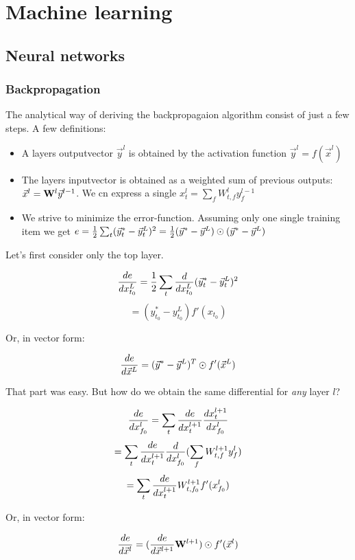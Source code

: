 \section{Machine learning}

\subsection{Neural networks}

\subsubsection{Backpropagation}
The analytical way of deriving the backpropagaion algorithm consist of just a few steps. 
A few definitions: 

\begin{itemize}
	\item A layers outputvector $\vec{y}^l$ is obtained by the activation function $\vec{y}^l = f(\vec{x}^l) $
	\item The layers inputvector is obtained as a weighted sum of previous outputs: $\vec{x}^l = \mathbf{W}^l \vec{y}^{l-1} $. We cn express a single $x_t^l = \sum_f W_{t,f}^l y_f^{l-1}$
	\item We strive to minimize the error-function. Assuming only one single training item we get $e = \frac{1}{2} \sum_t (\vec{y}^*_t - \vec{y}^L_t)^2 = \frac{1}{2} (\vec{y}^* - \vec{y}^L) \odot (\vec{y}^* - \vec{y}^L) $
\end{itemize}

Let's first consider only the top layer. 

$$   \frac{ \mathop{de} }{ \mathop{dx_{t_0}^L} }  = \frac{1}{2} \sum_t  \frac{ \mathop{d} }{ \mathop{dx_{t_0}^L} }  (\vec{y}^*_t - \vec{y}^L_t)^2 $$
$$ = (y_{t_0}^* - y_{t_0}^L) f'(x_{t_0}) $$

Or, in vector form: 

$$  \frac{ \mathop{de} }{ \mathop{d\vec{x}^L} }  = (\vec{y}^* - \vec{y}^L)^T \odot f'(\vec{x}^L)  $$


That part was easy. But how do we obtain the same differential for \emph{any} layer $l$?

$$  \frac{ \mathop{de} }{ \mathop{dx_{f_0}^l} }  = \sum_t  \frac{ \mathop{de} }{ \mathop{dx_t^{l+1}} }   \frac{ \mathop{dx_t^{l+1}} }{ \mathop{dx_{f_0}^l} }   $$
$$                         = \sum_t  \frac{ \mathop{de} }{ \mathop{dx_t^{l+1}} }   \frac{ \mathop{d} }{ \mathop{dx_{f_0}^l} }  ( \sum_f W_{t,f}^{l+1} y_f^l ) $$
$$                         = \sum_t  \frac{ \mathop{de} }{ \mathop{dx_t^{l+1}} }  W_{t,f_0}^{l+1} f'(x_{f_0}^l)  $$

Or, in vector form: 

$$  \frac{ \mathop{de} }{ \mathop{d\vec{x}^l} }  = (  \frac{ \mathop{de} }{ \mathop{d\vec{x}^{l+1}} }  \mathbf{W}^{l+1} ) \odot f'(\vec{x}^l)  $$

